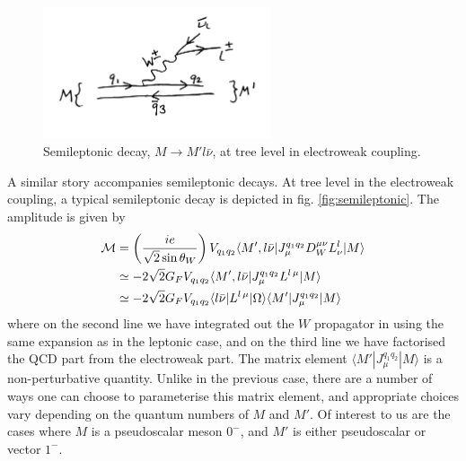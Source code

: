 \begin{figure}
  \vspace{-10pt}
  \begin{center}
    \includegraphics[width=0.6\textwidth]{images/semileptonicdecay.jpg}
  \end{center}
  \vspace{-30pt}
  \caption{Semileptonic decay, $M\to M'l\bar{\nu}$, at tree level in electroweak coupling.}
  \label{fig:semileptonicdecay}
\end{figure}

A similar story accompanies semileptonic decays. At tree level in the electroweak coupling, a typical semileptonic decay is depicted in fig. \ref{fig:semileptonic}. The amplitude is given by
\begin{align}
  \nonumber
  \mathcal{M} & = \left( { ie \over \sqrt{2} \sin\theta_W }\right) V_{q_1q_2} \langle M', l\bar{\nu} | J_{\mu}^{q_1q_2} D_W^{\mu\nu} L^l_{\nu} | M \rangle \\
  \nonumber
  & \simeq -2\sqrt{2} G_F V_{q_1q_2} \langle M', l\bar{\nu} | J_{\mu}^{q_1q_2} L^{l\, \mu} | M \rangle \\
  & \simeq -2\sqrt{2} G_F V_{q_1q_2} \langle l\bar{\nu} | L^{l\,\mu} | \Omega \rangle \langle M' | J_{\mu}^{q_1q_2} | M \rangle
  \label{eq:semileptonic}
\end{align}
where on the second line we have integrated out the $W$ propagator in using the same expansion as in the leptonic case, and on the third line we have factorised the QCD part from the electroweak part. The matrix element $\langle M' | J_{\mu}^{q_1q_2} | M \rangle$ is a non-perturbative quantity. Unlike in the previous case, there are a number of ways one can choose to parameterise this matrix element, and appropriate choices vary depending on the quantum numbers of $M$ and $M'$. Of interest to us are the cases where $M$ is a pseudoscalar meson $0^-$, and $M'$ is either pseudoscalar or vector $1^-$.

